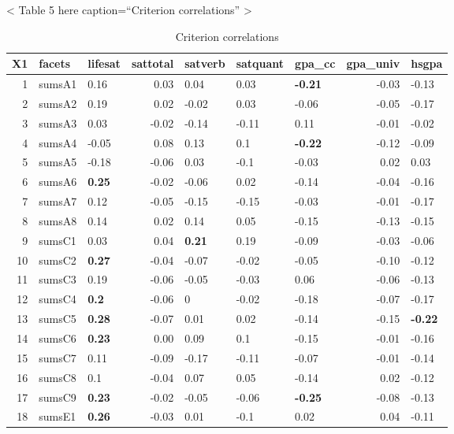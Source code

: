 \documentclass[,man,floatsintext]{apa6}
\theoremstyle{definition}
\theoremstyle{definition}
\theoremstyle{definition}
\theoremstyle{remark}
\begin{document}
\textless{} Table 5 here caption=\enquote{Criterion correlations}
\textgreater{}

\begin{table}[ht]
\centering
\caption{Criterion correlations} 
\begingroup\fontsize{5.5pt}{4.5pt}\selectfont
\begin{tabular}{rllrlllrl}
  \hline
X1 & facets & lifesat & sattotal & satverb & satquant & gpa\_cc & gpa\_univ & hsgpa \\ 
  \hline
  1 & sumsA1 & 0.16 & 0.03 & 0.04 & 0.03 & \textbf{-0.21} & -0.03 & -0.13 \\ 
    2 & sumsA2 & 0.19 & 0.02 & -0.02 & 0.03 & -0.06 & -0.05 & -0.17 \\ 
    3 & sumsA3 & 0.03 & -0.02 & -0.14 & -0.11 & 0.11 & -0.01 & -0.02 \\ 
    4 & sumsA4 & -0.05 & 0.08 & 0.13 & 0.1 & \textbf{-0.22} & -0.12 & -0.09 \\ 
    5 & sumsA5 & -0.18 & -0.06 & 0.03 & -0.1 & -0.03 & 0.02 & 0.03 \\ 
    6 & sumsA6 & \textbf{0.25} & -0.02 & -0.06 & 0.02 & -0.14 & -0.04 & -0.16 \\ 
    7 & sumsA7 & 0.12 & -0.05 & -0.15 & -0.15 & -0.03 & -0.01 & -0.17 \\ 
    8 & sumsA8 & 0.14 & 0.02 & 0.14 & 0.05 & -0.15 & -0.13 & -0.15 \\ 
    9 & sumsC1 & 0.03 & 0.04 & \textbf{0.21} & 0.19 & -0.09 & -0.03 & -0.06 \\ 
   10 & sumsC2 & \textbf{0.27} & -0.04 & -0.07 & -0.02 & -0.05 & -0.10 & -0.12 \\ 
   11 & sumsC3 & 0.19 & -0.06 & -0.05 & -0.03 & 0.06 & -0.06 & -0.13 \\ 
   12 & sumsC4 & \textbf{0.2} & -0.06 & 0 & -0.02 & -0.18 & -0.07 & -0.17 \\ 
   13 & sumsC5 & \textbf{0.28} & -0.07 & 0.01 & 0.02 & -0.14 & -0.15 & \textbf{-0.22} \\ 
   14 & sumsC6 & \textbf{0.23} & 0.00 & 0.09 & 0.1 & -0.15 & -0.01 & -0.16 \\ 
   15 & sumsC7 & 0.11 & -0.09 & -0.17 & -0.11 & -0.07 & -0.01 & -0.14 \\ 
   16 & sumsC8 & 0.1 & -0.04 & 0.07 & 0.05 & -0.14 & 0.02 & -0.12 \\ 
   17 & sumsC9 & \textbf{0.23} & -0.02 & -0.05 & -0.06 & \textbf{-0.25} & -0.08 & -0.13 \\ 
   18 & sumsE1 & \textbf{0.26} & -0.03 & 0.01 & -0.1 & 0.02 & 0.04 & -0.11 \\ 

\end{tabular}
\end{table}
\end{document}
